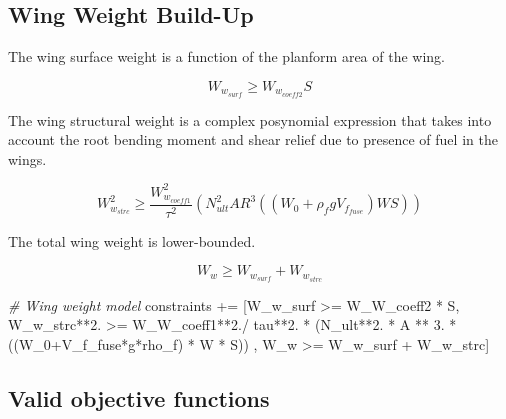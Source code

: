\documentclass[]{article}
\newenvironment{Shaded}{}{}
\newcommand{\DecValTok}[1]{\textcolor[rgb]{0.25,0.63,0.44}{#1}}
\newcommand{\CommentTok}[1]{\textcolor[rgb]{0.38,0.63,0.69}{\textit{#1}}}
\newcommand{\OperatorTok}[1]{\textcolor[rgb]{0.40,0.40,0.40}{#1}}
\newcommand{\NormalTok}[1]{#1}
\begin{document}
\subsection{Wing Weight Build-Up}\label{wing-weight-build-up}

The wing surface weight is a function of the planform area of the wing.

\begin{equation}
W_{w_{surf}} \geq W_{w_{coeff2}} S
\label{e:wwsurf}
\end{equation}

The wing structural weight is a complex posynomial expression that takes
into account the root bending moment and shear relief due to presence of
fuel in the wings.

\begin{equation}
W_{w_{strc}}^2 \geq \frac{W_{w_{coeff1}}^2}{\tau^2} (N_{ult}^2 AR ^ 3 ((W_0+\rho_fgV_{f_{fuse}}) W S))
\label{e:wwstrc}
\end{equation}

The total wing weight is lower-bounded.

\begin{equation}
W_w \geq W_{w_{surf}} + W_{w_{strc}}
\label{e:ww}
\end{equation}

\begin{Shaded}
\begin{Highlighting}[]
        \CommentTok{# Wing weight model}
\NormalTok{        constraints }\OperatorTok{+=}\NormalTok{ [W_w_surf }\OperatorTok{>=}\NormalTok{ W_W_coeff2 }\OperatorTok{*}\NormalTok{ S,}
\NormalTok{            W_w_strc}\OperatorTok{**}\DecValTok{2}\NormalTok{. }\OperatorTok{>=}\NormalTok{ W_W_coeff1}\OperatorTok{**}\DecValTok{2}\NormalTok{.}\OperatorTok{/}\NormalTok{ tau}\OperatorTok{**}\DecValTok{2}\NormalTok{. }\OperatorTok{*}
\NormalTok{            (N_ult}\OperatorTok{**}\DecValTok{2}\NormalTok{. }\OperatorTok{*}\NormalTok{ A }\OperatorTok{**} \DecValTok{3}\NormalTok{. }\OperatorTok{*}\NormalTok{ ((W_0}\OperatorTok{+}\NormalTok{V_f_fuse}\OperatorTok{*}\NormalTok{g}\OperatorTok{*}\NormalTok{rho_f) }\OperatorTok{*}\NormalTok{ W }\OperatorTok{*}\NormalTok{ S)) ,}
\NormalTok{            W_w }\OperatorTok{>=}\NormalTok{ W_w_surf }\OperatorTok{+}\NormalTok{ W_w_strc]}
\end{Highlighting}
\end{Shaded}

\subsection{Valid objective functions}\label{valid-objective-functions}
\end{document}
